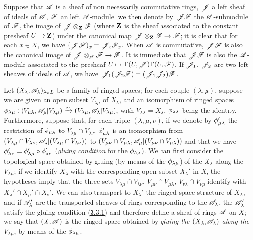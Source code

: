 \begin{env}[4.1.6]
\label{env-0.4.1.6}
Suppose that $\mathscr{A}$ is a sheaf of non necessarily commutative rings, $\mathscr{J}$
a left sheaf of ideals of $\mathscr{A}$, $\mathscr{F}$ an left $\mathscr{A}$-module; we then
denote by $\mathscr{J}\mathscr{F}$ the $\mathscr{A}$-submodule of $\mathscr{F}$, the image of
$\mathscr{J}\otimes_\mathbf{Z}\mathscr{F}$ (where $\mathbf{Z}$ is the sheaf associated to the
constant presheaf $U\mapsto\mathbf{Z}$) under the canonical map
$\mathscr{J}\otimes_\mathbf{Z}\mathscr{F}\to\mathscr{F}$; it is clear that for each $x\in X$, we
have $(\mathscr{J}\mathscr{F})_x=\mathscr{J}_x\mathscr{F}_x$. When $\mathscr{A}$ is commutative,
$\mathscr{J}\mathscr{F}$ is also the canonical image of
$\mathscr{J}\otimes_\mathscr{A}\mathscr{F}\to\mathscr{F}$. It is immediate that $\mathscr{J}\mathscr{F}$ is
also the $\mathscr{A}$-module associated to the presheaf
$U\mapsto\Gamma(U,\mathscr{J})\Gamma(U,\mathscr{F})$. If $\mathscr{J}_1$, $\mathscr{J}_2$ are two
left sheaves of ideals of $\mathscr{A}$, we have
$\mathscr{J}_1(\mathscr{J}_2\mathscr{F})=(\mathscr{J}_1\mathscr{J}_2)\mathscr{F}$.
\end{env}

\begin{env}[4.1.7]
\label{env-0.4.1.7}
Let $(X_\lambda,\mathscr{A}_\lambda)_{\lambda\in L}$ be a family of ringed spaces;
for each couple $(\lambda,\mu)$, suppose we are given an open subset
$V_{\lambda\mu}$ of $X_\lambda$, and an isomorphism of ringed spaces
$\phi_{\lambda\mu}:(V_{\mu\lambda},\mathscr{A}_\mu|V_{\lambda\mu})
  \xrightarrow{\sim}(V_{\lambda\mu},\mathscr{A}_\lambda|V_{\lambda\mu})$, with
$V_{\lambda\lambda}=X_\lambda$, $\phi_{\lambda\lambda}$ being the identity.
Furthermore, suppose that, for each triple $(\lambda,\mu,\nu)$, if we denote by
$\phi_{\mu\lambda}'$ the restriction of $\phi_{\mu\lambda}$ to
$V_{\lambda\mu}\cap V_{\lambda\nu}$, $\phi_{\mu\lambda}'$ is an isomorphism
from $(V_{\lambda\mu}\cap V_{\lambda\nu},
  \mathscr{A}_\lambda|(V_{\lambda\mu}\cap V_{\lambda\nu}))$ to
$(V_{\mu\nu}\cap V_{\mu\lambda},\mathscr{A}_\mu|(V_{\mu\nu}\cap V_{\mu\lambda}))$ and
that we have $\phi_{\lambda\nu}'=\phi_{\lambda\mu}'\circ\phi_{\mu\nu}'$
({\em gluing condition} for the $\phi_{\lambda\mu}$). We can first consider
the topological space obtained by gluing (by means of the $\phi_{\lambda\mu}$)
of the $X_\lambda$
along the $V_{\lambda\mu}$; if we identify $X_\lambda$ with the corresponding
open subset $X_\lambda'$ in $X$, the hypotheses imply that the three sets
$V_{\lambda\mu}\cap V_{\lambda\nu}$, $V_{\mu\nu}\cap V_{\mu\lambda}$,
$V_{\nu\lambda}\cap V_{\nu\mu}$ identify with
$X_\lambda'\cap X_\mu'\cap X_\nu'$. We can also transport to $X_\lambda'$ the
ringed space structure of $X_\lambda$, and if $\mathscr{A}_\lambda'$ are the
transported sheaves of rings corresponding to the $\mathscr{A}_\lambda$, the
$\mathscr{A}_\lambda'$ satisfy the gluing condition \hyperref[env-0.3.3.1]{(3.3.1)} and therefore
define a sheaf of rings $\mathscr{A}$ on $X$; we say that $(X,\mathscr{A})$ is the ringed
space obtained by {\em gluing the $(X_\lambda,\mathscr{A}_\lambda)$ along the
$V_{\lambda\mu}$}, by means of the $\phi_{\lambda\mu}$.
\end{env}


